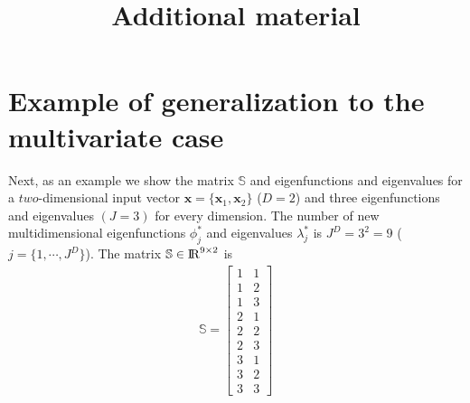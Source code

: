 \documentclass[onecolumn,a4paper,11pt]{article}
\title{Additional material}
\begin{document}
\maketitle

\tableofcontents

\section{Example of generalization to the multivariate case}

Next, as an example we show the matrix $\mathbb{S}$ and eigenfunctions and eigenvalues for a $two$-dimensional input vector $\bm{x}=\{\bm{x}_1,\bm{x}_2\}$ ($D=2$) and three eigenfunctions and eigenvalues $(J=3)$ for every dimension. The number of new multidimensional eigenfunctions $\phi^{\ast}_j$ and eigenvalues $\lambda^{\ast}_j$ is $J^D=3^2=9$ ($j=\{1,\cdots,J^D\}$). The matrix $\mathbb{S}\in {\rm I\!R}^{9 \times 2}$ is
%
\begin{eqnarray}
\mathbb{S}=
\left[ {\begin{array}{cc}
1 & 1 \nonumber \\
1 & 2 \\
1 & 3 \\
2 & 1 \\
2 & 2 \\
2 & 3 \\
3 & 1 \\
3 & 2 \\
3 & 3
\end{array} } \right]
\end{eqnarray} 
\end{document}
